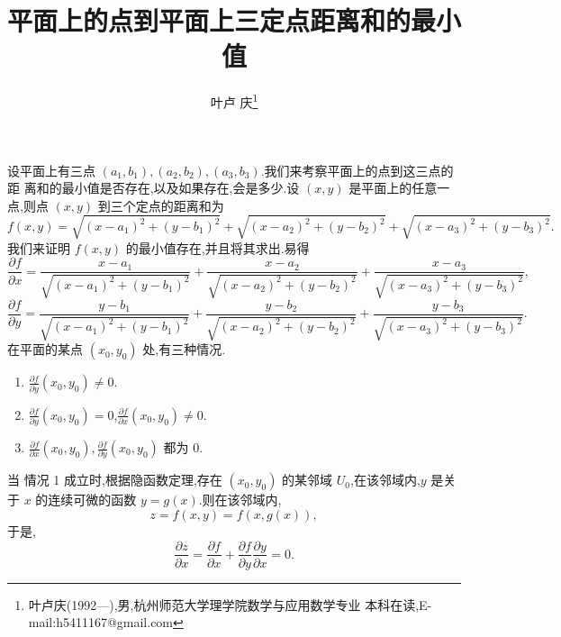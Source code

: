 \documentclass[a4paper]{article}
\newcommand{\pa}{\partial} \newcommand{\Om}{\Omega}
\begin{document}
\title{\huge{\bf{平面上的点到平面上三定点距离和的最小值}}} \author{\small{叶卢
    庆\footnote{叶卢庆(1992---),男,杭州师范大学理学院数学与应用数学专业
      本科在读,E-mail:h5411167@gmail.com}}}
\maketitle
设平面上有三点 $(a_1,b_1),(a_2,b_2),(a_3,b_3)$.我们来考察平面上的点到这三点的距
离和的最小值是否存在,以及如果存在,会是多少.设 $(x,y)$ 是平面上的任意一
点,则点 $(x,y)$ 到三个定点的距离和为
\begin{equation}
  \label{eq:1}
f(x,y)= \sqrt{(x-a_{1})^2+(y-b_1)^2}+\sqrt{(x-a_2)^2+(y-b_2)^2}+\sqrt{(x-a_3)^2+(y-b_3)^2}.
\end{equation}
我们来证明 $f(x,y)$ 的最小值存在,并且将其求出.易得
\begin{equation}
  \label{eq:2}
  \frac{\pa f}{\pa x}=\frac{x-a_1}{\sqrt{(x-a_1)^2+(y-b_1)^2}}+\frac{x-a_2}{\sqrt{(x-a_2)^2+(y-b_2)^2}}+\frac{x-a_3}{\sqrt{(x-a_3)^2+(y-b_3)^2}},
\end{equation}
\begin{equation}
  \label{eq:3}
    \frac{\pa f}{\pa y}=\frac{y-b_1}{\sqrt{(x-a_1)^2+(y-b_1)^2}}+\frac{y-b_2}{\sqrt{(x-a_2)^2+(y-b_2)^2}}+\frac{y-b_3}{\sqrt{(x-a_3)^2+(y-b_3)^2}}.
\end{equation}
在平面的某点 $(x_0,y_0)$ 处,有三种情况.
\begin{enumerate}
\item $\frac{\pa f}{\pa y}(x_0,y_{0})\neq 0$.
\item $\frac{\pa f}{\pa y}(x_0,y_0)=0$,$\frac{\pa f}{\pa x}(x_0,y_{0})\neq 0$.
\item $\frac{\pa f}{\pa x}(x_{0},y_{0}),\frac{\pa f}{\pa y}(x_0,y_0)$ 都为 $0$.
\end{enumerate}
当 情况 1 成立时,根据隐函数定理,存在 $(x_0,y_0)$ 的某邻域 $U_{0}$,在该邻域内,$y$
是关于 $x$ 的连续可微的函数 $y=g(x)$.则在该邻域内,
$$
z=f(x,y)=f(x,g(x)),
$$
于是,
$$
\frac{\pa z}{\pa x}=\frac{\pa f}{\pa x}+\frac{\pa f}{\pa y}\frac{\pa
  y}{\pa x}=0.
$$
\end{document}
